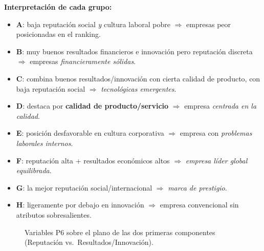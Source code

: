 \documentclass[11pt,a4paper]{article}
\newcommand{\arr}[4]{%
  \draw[-{Stealth[length=2mm]},thick,usachteal!80!black] (axis cs:0,0) -- (axis cs:#1,#2);%
  \node[anchor=#4,font=\small] at (axis cs:#1,#2) {\textbf{#3}};%
}
\begin{document}
\begin{solbox}
\textbf{Interpretación de cada grupo:}
\begin{itemize}[noitemsep,leftmargin=*]
\item \textbf{A}: baja reputación social \emph{y} cultura laboral pobre $\Rightarrow$ empresas peor posicionadas en el ranking.
\item \textbf{B}: muy buenos resultados financieros e innovación pero reputación discreta $\Rightarrow$ empresas \emph{financieramente sólidas}.
\item \textbf{C}: combina buenos resultados/innovación con cierta calidad de producto, con baja reputación social $\Rightarrow$ \emph{tecnológicas emergentes}.
\item \textbf{D}: destaca por \textbf{calidad de producto/servicio} $\Rightarrow$ empresa \emph{centrada en la calidad}.
\item \textbf{E}: posición desfavorable en cultura corporativa $\Rightarrow$ empresa con \emph{problemas laborales internos}.
\item \textbf{F}: reputación alta + resultados económicos altos $\Rightarrow$ \emph{empresa líder global equilibrada}.
\item \textbf{G}: la mejor reputación social/internacional $\Rightarrow$ \emph{marca de prestigio}.
\item \textbf{H}: ligeramente por debajo en innovación $\Rightarrow$ empresa convencional sin atributos sobresalientes.
\end{itemize}
\end{solbox}

\begin{figure}[H]
\centering
{}
\caption{Variables P6 sobre el plano de las dos primeras componentes (Reputación vs.\ Resultados/Innovación).}
\end{figure}
\end{document}
